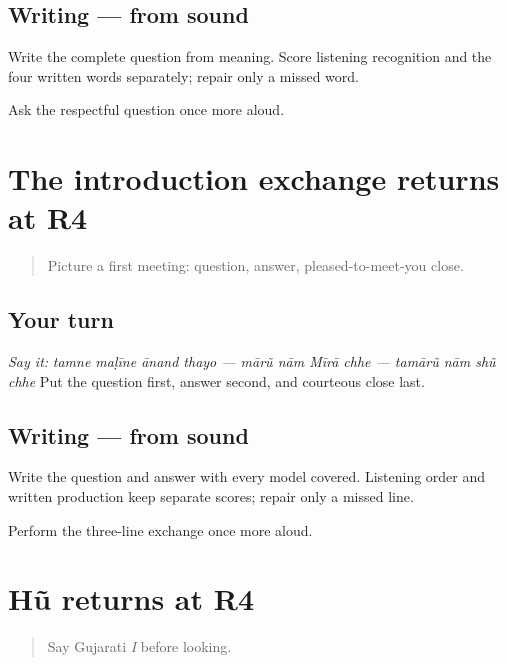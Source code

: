 \subsection*{Writing — from sound}
Write the complete question from meaning. Score listening recognition and the four written words separately; repair only a missed word.

\begin{tcolorbox}[breakable,colback=teal!4,colframe=teal!35!black,title={Before you move on}]
Ask the respectful question once more aloud.
\end{tcolorbox}
\section[Practice]{The introduction exchange returns at R4}

\label{lesson:GU-R17-introduction-r4}



\begin{quote}
Picture a first meeting: question, answer, pleased-to-meet-you close.
\end{quote}

\subsection*{Your turn}
\emph{Say it:} \emph{tamne maḷīne ānand thayo — mārũ nām Mīrā chhe — tamārũ nām shũ chhe} Put the question first, answer second, and courteous close last.

\subsection*{Writing — from sound}
Write the question and answer with every model covered. Listening order and written production keep separate scores; repair only a missed line.

\begin{tcolorbox}[breakable,colback=teal!4,colframe=teal!35!black,title={Before you move on}]
Perform the three-line exchange once more aloud.
\end{tcolorbox}
\section[Practice]{Hũ returns at R4}

\label{lesson:GU-R17-hun-r4}



\begin{quote}
Say Gujarati \emph{I} before looking.
\end{quote}

